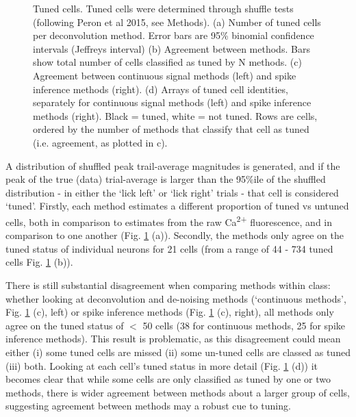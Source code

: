 \documentclass[a4paper,10pt,twocolumn]{article}
\begin{document}
\begin{figure}
\caption{\label{fig:tuned_cells} Tuned cells. Tuned cells were determined through shuffle tests (following Peron et al 2015, see Methods).  (a) Number of tuned cells per deconvolution method. Error bars are 95\% binomial confidence intervals (Jeffreys interval) (b) Agreement between methods. Bars show total number of cells classified as tuned by N methods. (c) Agreement between continuous signal methods (left) and spike inference methods (right). (d) Arrays of tuned cell identities, separately for continuous signal methods (left) and spike inference methods (right). Black = tuned, white = not tuned. Rows are cells, ordered by the number of methods that classify that cell as tuned (i.e. agreement, as plotted in c).}
\end{figure}

A distribution of shuffled peak trail-average magnitudes is generated, and if the peak of the true (data) trial-average is larger than the 95\%ile of the shuffled distribution - in either the `lick left' or `lick right' trials - that cell is considered `tuned'.
Firstly, each method estimates a different proportion of tuned vs untuned cells, both in comparison to estimates from the raw Ca\textsuperscript{2+} fluorescence, and in comparison to one another (Fig. \ref{fig:tuned_cells} (a)). Secondly, the methods only agree on the tuned status of individual neurons for 21 cells (from a range of 44 - 734 tuned cells Fig. \ref{fig:tuned_cells} (b)). 

There is still substantial disagreement when comparing methods within class: whether looking at deconvolution and de-noising methods (`continuous methods', Fig. \ref{fig:tuned_cells} (c), left) or spike inference methods (Fig. \ref{fig:tuned_cells} (c), right), all methods only agree on the tuned status of $<$ 50 cells (38 for continuous methods, 25 for spike inference methods). This result is problematic, as this disagreement could mean either (i) some tuned cells are missed (ii) some un-tuned cells are classed as tuned (iii) both. Looking at each cell's tuned status in more detail (Fig. \ref{fig:tuned_cells} (d)) it becomes clear that while some cells are only classified as tuned by one or two methods, there is wider agreement between methods about a larger group of cells, suggesting agreement between methods may a robust cue to tuning.


\end{document}
